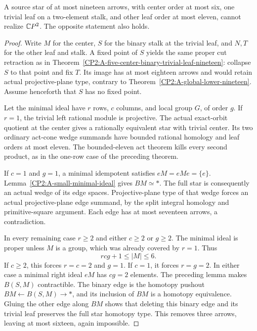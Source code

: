 \begin{theorem}
\label{CP2:A-six-center-binary-trivial-leaf-nineteen}
A source star of at most nineteen arrows, with center order
at most six, one trivial leaf on a two-element stalk, and
other leaf order at most eleven, cannot realize $\mathbb{C}P^2$.
The opposite statement also holds.
\end{theorem}
\begin{proof}
Write $M$ for the center, $S$ for the binary stalk at the
trivial leaf, and $N,T$ for the other leaf and stalk.
A fixed point of $S$ yields the same proper cut retraction
as in Theorem~\ref{CP2:A-five-center-binary-trivial-leaf-nineteen}:
collapse $S$ to that point and fix $T$. Its image has at most
eighteen arrows and would retain actual projective-plane
type, contrary to Theorem~\ref{CP2:A-global-lower-nineteen}.
Assume henceforth that $S$ has no fixed point.

Let the minimal ideal have $r$ rows, $c$ columns, and local
group $G$, of order $g$. If $r=1$, the trivial left rational
module is projective. The actual exact-orbit quotient at
the center gives a rationally equivalent star with trivial
center. Its two ordinary act-cone wedge summands have
bounded rational homology and leaf orders at most eleven.
The bounded-eleven act theorem kills every second product,
as in the one-row case of the preceding theorem.

If $c=1$ and $g=1$, a minimal idempotent satisfies
$eM=eMe=\{e\}$. Lemma~\ref{CP2:A-small-minimal-ideal}
gives $BM\simeq *$. The full star is consequently an actual
wedge of its edge spaces. Projective-plane type of that
wedge forces an actual projective-plane edge summand, by
the split integral homology and primitive-square argument.
Each edge has at most seventeen arrows, a contradiction.

In every remaining case $r\geq2$ and either $c\geq2$ or
$g\geq2$. The minimal ideal is proper unless $M$ is a
group, which was already covered by $r=1$. Thus
\[
 rcg+1\leq |M|\leq6.
\]
If $c\geq2$, this forces $r=c=2$ and $g=1$.
If $c=1$, it forces $r=g=2$. In either case a minimal
right ideal $eM$ has $cg=2$ elements.
The preceding lemma makes $B(S,M)$ contractible.
The binary edge is the homotopy pushout
$BM\leftarrow B(S,M)\to *$, and its inclusion of $BM$
is a homotopy equivalence. Gluing the other edge along
$BM$ shows that deleting this binary edge and its trivial
leaf preserves the full star homotopy type. This removes
three arrows, leaving at most sixteen, again impossible.
\end{proof}
